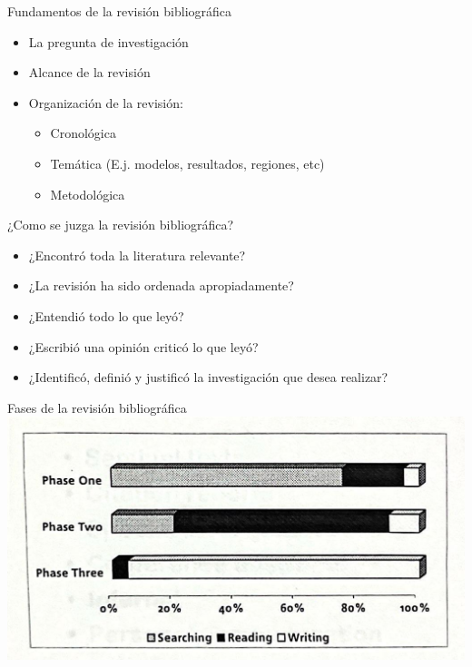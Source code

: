 \documentclass[
10pt,
aspectratio=169,
]{beamer}
\begin{document}
\begin{frame}[c]{Fundamentos de la revisi\'on bibliogr\'afica}
\begin{itemize}
\item La pregunta de investigaci\'on
\item Alcance de la revisi\'on
\item Organizaci\'on de la revisi\'on:
\begin{itemize}
\item Cronol\'ogica
\item Tem\'atica (E.j. modelos, resultados, regiones, etc)
\item Metodol\'ogica
\end{itemize}
\end{itemize}
\end{frame}


\begin{frame}[c]{¿Como se juzga la revisi\'on bibliogr\'afica?}
\begin{itemize}
\item ¿Encontr\'o toda la literatura relevante?
\item ¿La revisi\'on ha sido ordenada apropiadamente?
\item ¿Entendi\'o todo lo que ley\'o?
\item ¿Escribi\'o una opini\'on critic\'o lo que ley\'o?
\item ¿Identific\'o, defini\'o y justific\'o la investigaci\'on que desea realizar?
\end{itemize}
\end{frame}

\begin{frame}[c]{Fases de la revisi\'on bibliogr\'afica}
\centering
\includegraphics[width=\textwidth]{fig4.jpeg}
\end{frame}
\end{document}
